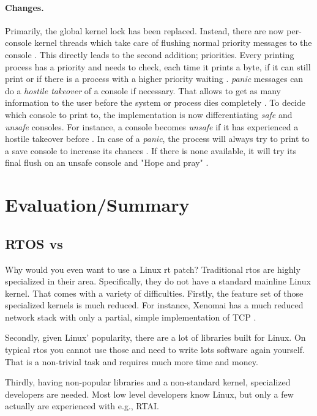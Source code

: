 \documentclass[10pt,twocolumn,a4paper]{article}
\begin{document}
\paragraph{Changes.}
Primarily, the global kernel lock has been replaced.
Instead, there are now per-console kernel threads which take care of flushing normal priority messages to the console \cite{gleixner_printk_2024}.
This directly leads to the second addition; priorities.
Every printing process has a priority and needs to check, each time it prints a byte, if it can still print or if there is a process with a higher priority waiting \cite{edge_discussion_2022}.
\emph{panic} messages can do a \emph{hostile takeover} of a console if necessary.
That allows to get as many information to the user before the system or process dies completely \cite{edge_discussion_2022}.
To decide which console to print to, the  implementation is now differentiating \emph{safe} and \emph{unsafe} consoles.
For instance, a console becomes \emph{unsafe} if it has experienced a hostile takeover before \cite{kernel_development_community_console}.
In case of a \emph{panic}, the process will always try to print to a save console to increase its chances \cite{gleixner_printk_2024}.
If there is none available, it will try its final flush on an unsafe console and "Hope and pray" \cite{kernel_development_community_console}.

\section{Evaluation/Summary}
\subsection{RTOS vs }
Why would you even want to use a Linux \acrshort{rt} patch?
Traditional \acrshort{rtos} are highly specialized in their area.
Specifically, they do not have a standard mainline Linux kernel.
That comes with a variety of difficulties.
Firstly, the feature set of those specialized kernels is much reduced.
For instance, Xenomai has a much reduced network stack with only a partial, simple implementation of TCP \cite{xenomai_network_2024}.

Secondly, given Linux' popularity, there are a lot of libraries built for Linux.
On typical \acrshort{rtos} you cannot use those and need to write lots software again yourself.
That is a non-trivial task and requires much more time and money.

Thirdly, having non-popular libraries and a non-standard kernel, specialized developers are needed.
Most low level developers know Linux, but only a few actually are experienced with e.g., RTAI.
\end{document}
